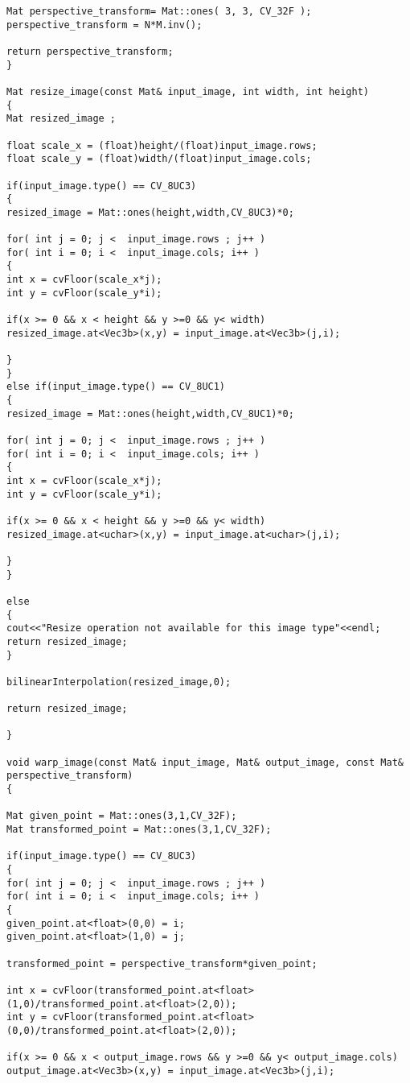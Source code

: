 \begin{lstlisting}
Mat perspective_transform= Mat::ones( 3, 3, CV_32F );
perspective_transform = N*M.inv();

return perspective_transform;
}

Mat resize_image(const Mat& input_image, int width, int height)
{
Mat resized_image ;

float scale_x = (float)height/(float)input_image.rows;
float scale_y = (float)width/(float)input_image.cols;

if(input_image.type() == CV_8UC3)
{
resized_image = Mat::ones(height,width,CV_8UC3)*0;

for( int j = 0; j <  input_image.rows ; j++ )
for( int i = 0; i <  input_image.cols; i++ )
{
int x = cvFloor(scale_x*j);
int y = cvFloor(scale_y*i);

if(x >= 0 && x < height && y >=0 && y< width)
resized_image.at<Vec3b>(x,y) = input_image.at<Vec3b>(j,i);

}
}
else if(input_image.type() == CV_8UC1)
{
resized_image = Mat::ones(height,width,CV_8UC1)*0;

for( int j = 0; j <  input_image.rows ; j++ )
for( int i = 0; i <  input_image.cols; i++ )
{
int x = cvFloor(scale_x*j);
int y = cvFloor(scale_y*i);

if(x >= 0 && x < height && y >=0 && y< width)
resized_image.at<uchar>(x,y) = input_image.at<uchar>(j,i);

}
}

else
{
cout<<"Resize operation not available for this image type"<<endl;
return resized_image;
}

bilinearInterpolation(resized_image,0);

return resized_image;

}

void warp_image(const Mat& input_image, Mat& output_image, const Mat& perspective_transform)
{

Mat given_point = Mat::ones(3,1,CV_32F); 
Mat transformed_point = Mat::ones(3,1,CV_32F);

if(input_image.type() == CV_8UC3)
{
for( int j = 0; j <  input_image.rows ; j++ )
for( int i = 0; i <  input_image.cols; i++ )
{
given_point.at<float>(0,0) = i;
given_point.at<float>(1,0) = j;

transformed_point = perspective_transform*given_point;

int x = cvFloor(transformed_point.at<float>(1,0)/transformed_point.at<float>(2,0));
int y = cvFloor(transformed_point.at<float>(0,0)/transformed_point.at<float>(2,0));

if(x >= 0 && x < output_image.rows && y >=0 && y< output_image.cols)
output_image.at<Vec3b>(x,y) = input_image.at<Vec3b>(j,i);


\end{lstlisting}
